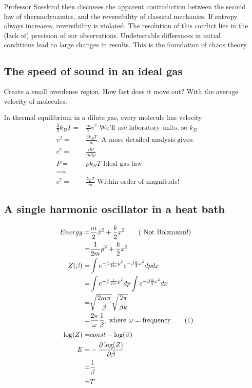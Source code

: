 \documentclass[]{article}
\newcommand\numberthis{\addtocounter{equation}{1}\tag{\theequation}}
\begin{document}
Professor Susskind then discusses the apparent contradiction between the second law of thermodynamics, and the reversibility of classical mechanics.  If entropy always increases, reversibility is violated.  The resolution of this conflict lies in the (lack of) precision of our observations.  Undetectable differences in initial conditions lead to large changes in results.  This is the foundation of chaos theory.

\subsection{The speed of sound in an ideal gas}

Create a small overdense region. How fast does it move out? With the average velocity of molecules.

In thermal equilibrium in a dilute gas, every molecule has velocity
\begin{align*}
\frac{3}{2} k_B T =& \frac{m}{2} v^2\text{ We'll use laboratory units, so $k_B$}\\
v^2 =& \frac{3 k_B T}{m}\text{. A more detailed analysis gives:}\\
c^2 =& \frac{\partial P}{m \partial \rho}\\
P =& \rho k_B T\text{ Ideal gas law}\\
\implies&\\
c^2 =& \frac{k_B T}{m}\text{ Within order of magnitude!}
\end{align*}


\subsection{A single harmonic oscillator in a heat bath}

\begin{align*}
Energy =& \frac{m}{2} \dot{x}^ 2 + \frac{k}{2} x^2\tag{ Not Bolzmann!}\\
=& \frac{1}{2m} p^ 2 + \frac{k}{2} x^2\\
Z(\beta) =& \int e^{-\beta \frac{1}{2m} p^ 2 } e^{-\beta \frac{k}{2} x^2} dp dx\\
=& \int e^{-\beta \frac{1}{2m} p^ 2 } dp \int e^{-\beta \frac{k}{2} x^2} dx\\
=& \sqrt{\frac{2m\pi}{\beta}}\sqrt{\frac{2 \pi}{\beta k}}\\
=& \frac{2 \pi}{\omega}\frac{1}{\beta}\text{, where $\omega=$ frequency}\numberthis\label{eq:Z:classical:q}\\
\log(Z) =& const - \log(\beta)\\
E =& - \frac{\partial \log(Z)}{\partial \beta}\\
=& \frac{1}{\beta}\\
=& T
\end{align*}
\end{document}
